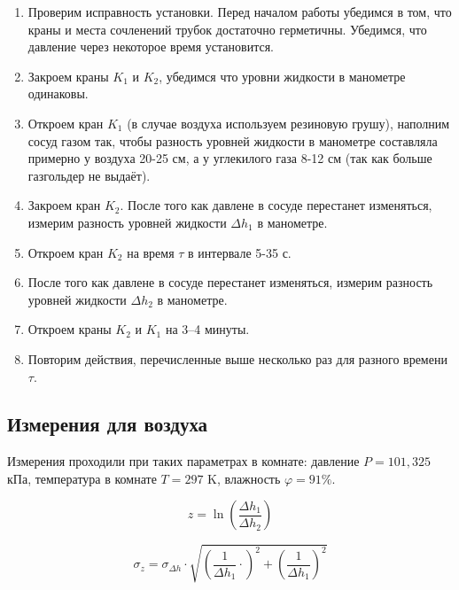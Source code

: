 \documentclass[a4paper,12pt]{article}
\begin{document}
\begin{enumerate}
    \item Проверим исправность установки. Перед началом работы убедимся в том, что краны и места сочленений трубок достаточно герметичны. Убедимся, что давление через некоторое время установится.
    \item Закроем краны $K_1$ и $K_2$, убедимся что уровни жидкости в манометре одинаковы.
    \item Откроем кран $K_1$ (в случае воздуха используем резиновую грушу), наполним сосуд газом так, чтобы разность уровней жидкости в манометре составляла примерно у воздуха 20-25 см, а у углекилого газа 8-12 см (так как больше газгольдер не выдаёт).
    \item Закроем кран  $K_2$. После того как давлене в сосуде перестанет изменяться, измерим разность уровней жидкости $\Delta h_1$ в манометре.
    \item Откроем кран $K_2$ на время $\tau$ в интервале 5-35 с.
    \item После того как давлене в сосуде перестанет изменяться, измерим разность уровней жидкости $\Delta h_2$ в манометре.
    \item Откроем краны $K_2$ и $K_1$ на 3–4 минуты.
    \item Повторим действия, перечисленные выше  несколько раз для разного времени $\tau$.

\end{enumerate}


\subsection{Измерения для воздуха}

Измерения проходили при таких параметрах в комнате: давление  $P = 101,325$ кПа, температура в комнате $T = 297$ K, влажность $\varphi = 91 \%$.

\[
z = \ln\left(\frac{\Delta h_1}{\Delta h_2}\right)
\]

\[
\sigma_z = \sigma_{\Delta h} \cdot \sqrt{\left( \frac{1}{\Delta h_1} \cdot  \right)^2 + \left( \frac{1}{\Delta h_1} \right)^2 }
\]
\end{document}
